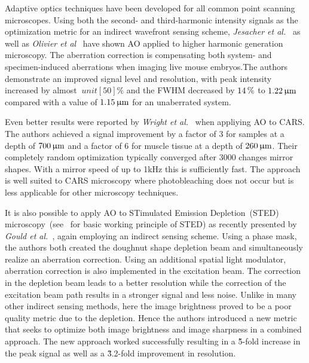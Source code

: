 Adaptive optics techniques have been developed for all common point scanning microscopes. Using both the second- and third-harmonic intensity signals as the optimization metric for an indirect wavefront sensing scheme, \emph{Jesacher et al.}~\cite{scan_HG_dynamic} as well as \emph{Olivier et al}~\cite{scan_HG_embryos} have shown AO applied to higher harmonic generation microscopy. The aberration correction is compensating both system- and specimen-induced aberrations when imaging live mouse embryos.The authors demonstrate an improved signal level and resolution, with peak intensity increased by almost $\ unit[50]{\%}$ and the FWHM decreased by $\unit[14]{\%}$ to  $\unit[1.22]{\upmu m}$ compared with a value of $\unit[1.15]{\upmu m}$ for an unaberrated system.

Even better results were reported by \emph{Wright et al.}~\cite{scan_CARS} when appliying AO to CARS. The authors achieved a signal improvement by a factor of 3 for samples at a depth of $\unit[700]{\upmu m}$ and a factor of 6 for muscle tissue at a depth of $\unit[260]{\upmu m}$. Their completely random optimization typically converged after 3000 changes mirror shapes. With a mirror speed of up to 1kHz this is sufficiently fast.  The approach is well suited to CARS microscopy where photobleaching does not occur but is less applicable for other microscopy techniques. 

It is also possible to apply AO to STimulated Emission Depletion~(STED) microscopy~(see~\cite{scan_STED_principle} for basic working principle of STED) as recently presented by \emph{Gould et al.}~\cite{scan_STED}, again employing an indirect sensing scheme. Using a phase mask, the authors both created the doughnut shape depletion beam and simultaneously realize an aberration correction. Using an additional spatial light modulator, aberration correction is also implemented in the  excitation beam. The correction in the depletion beam leads to a better resolution while the correction of the excitation beam path results in a stronger signal and less noise. Unlike in many other indirect sensing methods, here the image brightness proved to be a poor quality metric due to the depletion. Hence the authors  introduced a new metric that seeks to optimize both image brightness and image sharpness in a combined approach. The new approach worked successfully resulting in a \~5-fold increase in the peak signal as well as a \~3.2-fold improvement in resolution.

